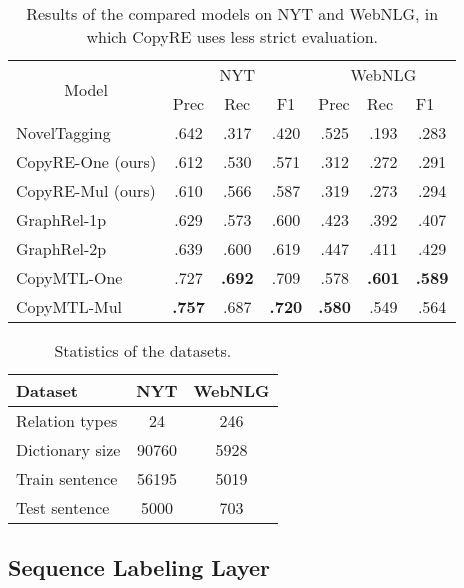 \documentclass[letterpaper]{article} \usepackage{aaai20}  \usepackage{times}  \usepackage{helvet} \usepackage{courier}  \usepackage[hyphens]{url}  \usepackage{graphicx}
\begin{document}
\begin{table*}[t]
  \centering
\begin{tabular}{cccc|ccc}
  \hline
  \multicolumn{1}{c|}{\multirow{2}{*}{Model}} & \multicolumn{3}{c|}{NYT} & \multicolumn{3}{c}{WebNLG} \\ \cline{2-7} 
  \multicolumn{1}{c|}{} & Prec & Rec & F1 & \multicolumn{1}{l}{Prec} & \multicolumn{1}{l}{Rec} & \multicolumn{1}{l}{F1} \\ \hline
  \multicolumn{1}{l|}{NovelTagging} & .642 & .317 & .420 & .525 & .193 & .283 \\
\multicolumn{1}{l|}{CopyRE-One (ours)} & .612 & .530 & .571 & .312 & .272 & .291 \\
  \multicolumn{1}{l|}{CopyRE-Mul (ours)} & .610 & .566 & .587 & .319 & .273 & .294 \\

\multicolumn{1}{l|}{GraphRel-1p} & .629 & .573 & .600 & .423 & .392 & .407 \\
  \multicolumn{1}{l|}{GraphRel-2p} & .639 & .600 & .619 & .447 & .411 & .429 \\
  \multicolumn{1}{l|}{CopyMTL-One} & .727 & \textbf{.692} & .709 & {.578} & \textbf{.601} & \textbf{.589} \\
  \multicolumn{1}{l|}{CopyMTL-Mul} & \textbf{.757} & {.687} & \textbf{.720} & \textbf{.580} & .549 & .564 \\ \hline
  \end{tabular}
\caption{Results of the compared models on NYT and WebNLG, in which CopyRE uses less strict evaluation.}
  \label{tab:main_result}
  
  \end{table*}

  \begin{table}[t]
    \centering
\begin{tabular}{lcc}
    \toprule
    Dataset & NYT &  WebNLG \\
    \midrule
    Relation types & 24 &  246 \\
    Dictionary size & 90760 &  5928 \\
    Train sentence & 56195 & 5019 \\
Test sentence & 5000 &  703 \\
\bottomrule
    \end{tabular}
\caption{Statistics of the datasets. }
    \label{tab:statistics}
    \end{table}
  \subsection{Sequence Labeling Layer}
  
\end{document}
